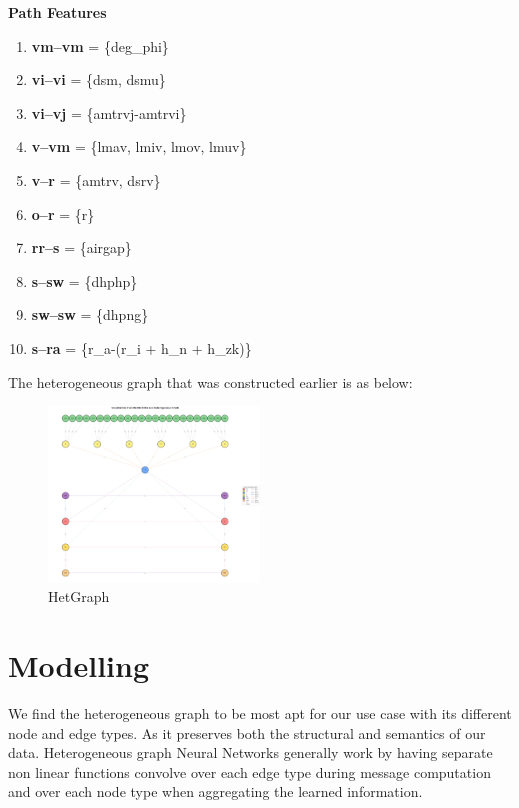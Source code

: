 \documentclass[a4paper,12pt]{article}
\begin{document}
\textbf{Path Features}

\begin{enumerate}

    \item \textbf{vm--vm} = \{deg\_phi\}

    \item \textbf{vi--vi} = \{dsm, dsmu\}

    \item \textbf{vi--vj} = \{amtrvj-amtrvi\}

    \item \textbf{v--vm} = \{lmav, lmiv, lmov, lmuv\}

    \item \textbf{v--r} = \{amtrv, dsrv\}
    
    \item \textbf{o--r} = \{r\}

    \item \textbf{rr--s} = \{airgap\}

    \item \textbf{s--sw} = \{dhphp\}
    
    \item \textbf{sw--sw} = \{dhpng\}
    
    \item \textbf{s--ra} = \{r\_a-(r\_i + h\_n + h\_zk)\}
    
\end{enumerate}
The heterogeneous graph that was constructed earlier is as below:
\begin{figure}[h]
    \centering
    \includegraphics[width=0.5\textwidth]{./ReportImages/graph.png} 
    \caption{HetGraph}
    \label{fig:Graph}
\end{figure}

\newpage 

\section*{Modelling}
We find the heterogeneous graph to be most apt for our use case with its different node and edge types. As it preserves both the structural and semantics of our data.
Heterogeneous graph Neural Networks generally work by having separate non linear functions convolve over each edge type during message computation and over each node type when aggregating the learned information.
\end{document}
